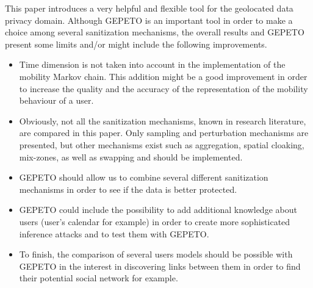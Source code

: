 This paper introduces a very helpful and flexible tool for the geolocated data privacy domain. Although GEPETO is an important tool in order to make a choice among several sanitization mechanisms, the overall results and GEPETO present some limits and/or might include the following improvements.

\begin{itemize}

\item Time dimension is not taken into account in the implementation of the mobility Markov chain. This addition might be a good improvement in order to increase the quality and the accuracy of the representation of the mobility behaviour of a user.

\item Obviously, not all the sanitization mechanisms, known in research literature, are compared in this paper. Only sampling and perturbation mechanisms are presented, but other mechanisms exist such as aggregation, spatial cloaking, mix-zones, as well as swapping and should be implemented.

\item GEPETO should allow us to combine several different sanitization mechanisms in order to see if the data is better protected.

\item GEPETO could include the possibility to add additional knowledge about users (user's calendar for example) in order to create more sophisticated inference attacks and to test them with GEPETO.

\item To finish, the comparison of several users models should be possible with GEPETO in the interest in discovering links between them in order to find their potential social network for example.

\end{itemize}